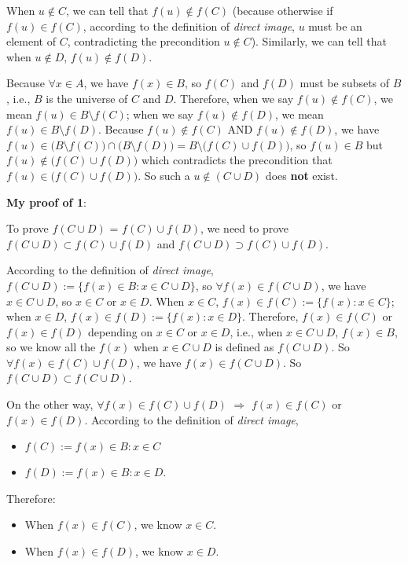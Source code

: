 \documentclass[12pt, letterpaper, oneside]{book}
\begin{document}
When $u \notin C$, we can tell that $f(u) \notin f(C)$ (because otherwise if
$f(u) \in f(C)$, according to the definition of \textit{direct image}, $u$ must
be an element of $C$, contradicting the precondition $u \notin C$). Similarly,
we can tell that when $u \notin D$, $f(u) \notin f(D)$.

Because $\forall x \in A$, we have $f(x) \in B$, so $f(C)$ and $f(D)$ must be
subsets of $B$, i.e., $B$ is the universe of $C$ and $D$. Therefore, when we
say $f(u) \notin f(C)$, we mean $f(u) \in B \setminus f(C)$; when we say $f(u)
  \notin f(D)$, we mean $f(u) \in B \setminus f(D)$. Because $f(u) \notin f(C)$
AND $f(u) \notin f(D)$, we have $f(u) \in \bigl(B \setminus f(C)\bigr) \cap
  \bigl(B \setminus f(D)\bigr) = B \setminus \bigl(f(C) \cup f(D)\bigr)$, so
$f(u) \in B$ but $f(u) \notin \bigl(f(C) \cup f(D)\bigr)$ which contradicts
the precondition that $f(u) \in \bigl(f(C) \cup f(D)\bigr)$. So such a $u
  \notin (C \cup D)$ does \textbf{not} exist.

\textbf{My proof of 1}:

To prove $f(C \cup D)$ = $f(C) \cup f(D)$, we need to prove $f(C \cup D)
  \subset f(C) \cup f(D)$ and $f(C \cup D) \supset f(C) \cup f(D)$.

According to the definition of \textit{direct image}, $f(C \cup D) := \{f(x)
  \in B: x \in C \cup D\}$, so $\forall f(x) \in f(C \cup D)$, we have $x \in C
  \cup D$, so $x \in C$ or $x \in D$. When $x \in C$, $f(x) \in f(C) := \{f(x): x
  \in C\}$; when $x \in D$, $f(x) \in f(D) := \{f(x): x \in D\}$. Therefore, $f(x)
  \in f(C)$ or $f(x) \in f(D)$ depending on $x \in C$ or $x \in D$, i.e., when $x
  \in C \cup D$, $f(x) \in B$, so we know all the $f(x)$ when $x \in C \cup D$ is
defined as $f(C \cup D)$. So $\forall f(x) \in f(C) \cup f(D)$, we have $f(x)
  \in f(C \cup D)$. So $f(C \cup D) \subset f(C \cup D)$.

On the other way, $\forall f(x) \in f(C) \cup f(D)$ $\Rightarrow$ $f(x) \in
  f(C)$ or $f(x) \in f(D)$. According to the definition of \textit{direct image},
\begin{itemize}
  \item $f(C) := {f(x) \in B: x \in C}$
  \item $f(D) := {f(x) \in B: x \in D}$.
\end{itemize}

Therefore:
\begin{itemize}
  \item When $f(x) \in f(C)$, we know $x \in C$.
  \item When $f(x) \in f(D)$, we know $x \in D$.
\end{itemize}
\end{document}
